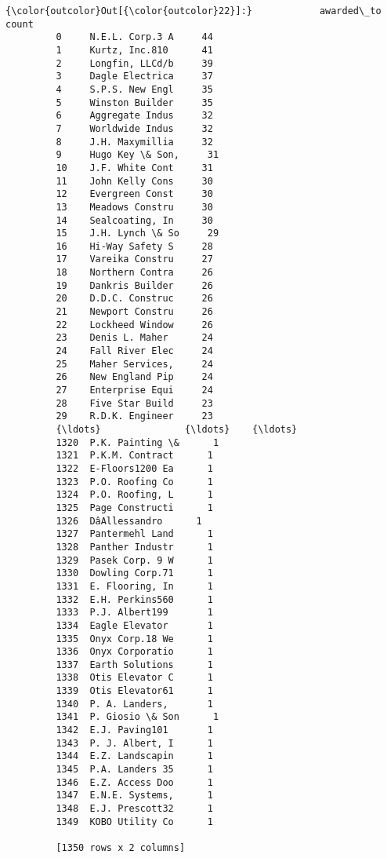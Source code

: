 \documentclass[11pt]{article}
\begin{document}
\begin{Verbatim}[commandchars=\\\{\}]
{\color{outcolor}Out[{\color{outcolor}22}]:}            awarded\_to  count
         0     N.E.L. Corp.3 A     44
         1     Kurtz, Inc.810      41
         2     Longfin, LLCd/b     39
         3     Dagle Electrica     37
         4     S.P.S. New Engl     35
         5     Winston Builder     35
         6     Aggregate Indus     32
         7     Worldwide Indus     32
         8     J.H. Maxymillia     32
         9     Hugo Key \& Son,     31
         10    J.F. White Cont     31
         11    John Kelly Cons     30
         12    Evergreen Const     30
         13    Meadows Constru     30
         14    Sealcoating, In     30
         15    J.H. Lynch \& So     29
         16    Hi-Way Safety S     28
         17    Vareika Constru     27
         18    Northern Contra     26
         19    Dankris Builder     26
         20    D.D.C. Construc     26
         21    Newport Constru     26
         22    Lockheed Window     26
         23    Denis L. Maher      24
         24    Fall River Elec     24
         25    Maher Services,     24
         26    New England Pip     24
         27    Enterprise Equi     24
         28    Five Star Build     23
         29    R.D.K. Engineer     23
         {\ldots}               {\ldots}    {\ldots}
         1320  P.K. Painting \&      1
         1321  P.K.M. Contract      1
         1322  E-Floors1200 Ea      1
         1323  P.O. Roofing Co      1
         1324  P.O. Roofing, L      1
         1325  Page Constructi      1
         1326  DâAllessandro      1
         1327  Pantermehl Land      1
         1328  Panther Industr      1
         1329  Pasek Corp. 9 W      1
         1330  Dowling Corp.71      1
         1331  E. Flooring, In      1
         1332  E.H. Perkins560      1
         1333  P.J. Albert199       1
         1334  Eagle Elevator       1
         1335  Onyx Corp.18 We      1
         1336  Onyx Corporatio      1
         1337  Earth Solutions      1
         1338  Otis Elevator C      1
         1339  Otis Elevator61      1
         1340  P. A. Landers,       1
         1341  P. Giosio \& Son      1
         1342  E.J. Paving101       1
         1343  P. J. Albert, I      1
         1344  E.Z. Landscapin      1
         1345  P.A. Landers 35      1
         1346  E.Z. Access Doo      1
         1347  E.N.E. Systems,      1
         1348  E.J. Prescott32      1
         1349  KOBO Utility Co      1
         
         [1350 rows x 2 columns]
\end{Verbatim}
            
\end{document}
